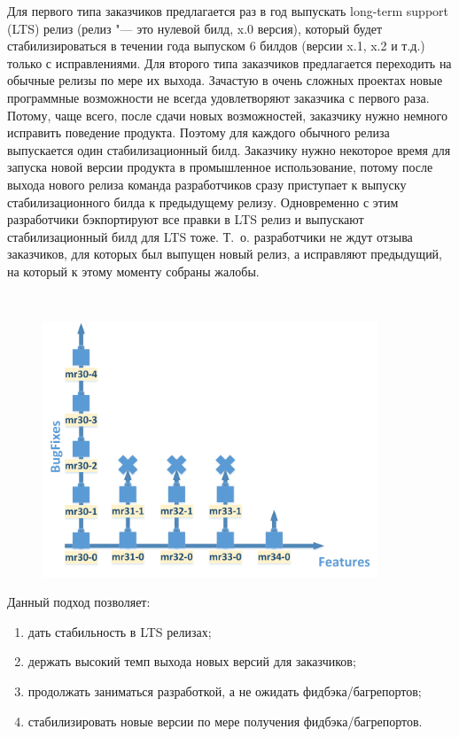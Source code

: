 \documentclass[10pt, a5paper]{article}
\begin{document}
Для первого типа заказчиков предлагается раз в год выпускать long-term support (LTS) релиз (релиз "--- это нулевой билд, x.0 версия), который будет стабилизироваться в течении года выпуском 6 билдов (версии x.1, x.2 и т.д.) только с исправлениями.
Для второго типа заказчиков предлагается переходить на обычные релизы по мере их выхода. Зачастую в очень сложных проектах новые программные возможности не всегда удовлетворяют заказчика с первого раза. Потому, чаще всего, после сдачи новых возможностей, заказчику нужно немного исправить поведение продукта. Поэтому для каждого обычного релиза выпускается один стабилизационный билд.
Заказчику нужно некоторое время для запуска новой версии продукта в промышленное использование, потому после выхода нового релиза команда разработчиков сразу приступает к выпуску стабилизационного билда к предыдущему релизу. Одновременно с этим разработчики бэкпортируют все правки в LTS релиз и выпускают стабилизационный билд для LTS тоже. Т.~о. разработчики не ждут отзыва заказчиков, для которых был выпущен новый релиз, а исправляют предыдущий, на который к этому моменту собраны жалобы.

~

\begin{figure}
  \centering
  \includegraphics[width=10cm]{05_releases_graph_report.png}
\end{figure}

Данный подход позволяет:

\begin{enumerate}
  \item дать стабильность в LTS релизах;
  \item держать высокий темп выхода новых версий для заказчиков;
  \item продолжать заниматься разработкой, а не ожидать фидбэка/багрепортов;
  \item стабилизировать новые версии по мере получения фидбэка/багрепортов.
\end{enumerate}
\end{document}
